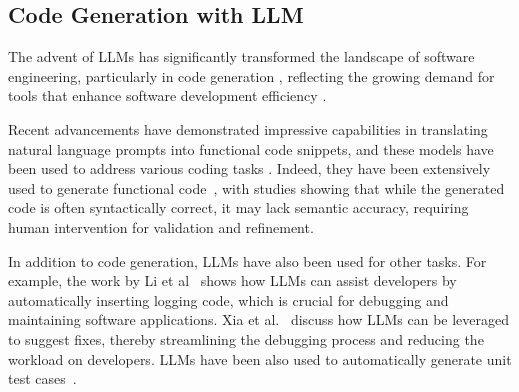 \label{sec:RW}
\subsection{Code Generation with LLM}
The advent of LLMs has significantly transformed the landscape of software engineering, particularly in code generation \cite{Fan:LlmSeSurveyProblems:ICSE-FoSE:2023}, reflecting the growing demand for tools that enhance software development efficiency \cite{Hou:SurveyLlmSe:TOSEM:2024}.

Recent advancements have demonstrated impressive capabilities in translating natural language prompts into functional code snippets, and these models have been used to address various coding tasks \cite{Li:LLMLoggingStatement:TSE:2024,Schafer:LLMUnitTesting:TSE:2023,Xia:LLMAutomatedProgramRepair:ICSE:2023}.
%
%
Indeed, they have been extensively used to generate functional code~\cite{Yetistiren:AssessingCopilot:PROMISE:2022,Corso:EmpiricalAssessment:ICPC:2024,Vaithilingam:ExpExpCoGen:CHI:2022,Mastropaolo:RobustnessGenCode:ICSE:2023,liu2024your,Fagadau:EmpiricalStudy:ICPC:2024,Donato:LLMConfig:ICPC:2025}, with studies showing that while the generated code is often syntactically correct, it may lack semantic accuracy, requiring human intervention for validation and refinement. %


In addition to code generation, LLMs have also been used for other tasks. For example, the work by Li et al~\cite{Li:LLMLoggingStatement:TSE:2024} shows how LLMs can assist developers by automatically inserting logging code, which is crucial for debugging and maintaining software applications. 
Xia et al.~\cite{Xia:LLMAutomatedProgramRepair:ICSE:2023} discuss how LLMs can be leveraged to suggest fixes, thereby streamlining the debugging process and reducing the workload on developers.
LLMs have been also used to automatically generate unit test cases~\cite{Schafer:LLMUnitTesting:TSE:2023}.


